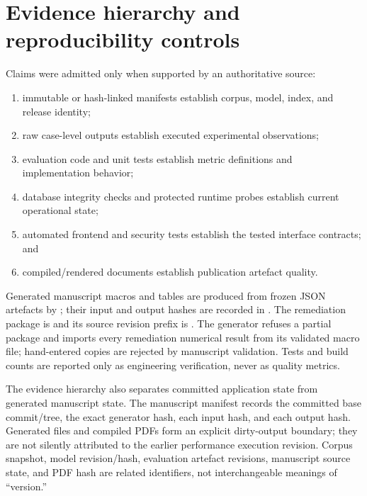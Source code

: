 \section{Evidence hierarchy and reproducibility controls}

Claims were admitted only when supported by an authoritative source:

\begin{enumerate}
  \item immutable or hash-linked manifests establish corpus, model, index, and release identity;
  \item raw case-level outputs establish executed experimental observations;
  \item evaluation code and unit tests establish metric definitions and implementation behavior;
  \item database integrity checks and protected runtime probes establish current operational state;
  \item automated frontend and security tests establish the tested interface contracts; and
  \item compiled/rendered documents establish publication artefact quality.
\end{enumerate}

Generated manuscript macros and tables are produced from frozen JSON artefacts by ; their input and output hashes are recorded in . The remediation package is \VTwoPackageStatus{} and its source revision prefix is \texttt{\VTwoEvaluationSourceCommitPrefix}. The generator refuses a partial package and imports every remediation numerical result from its validated macro file; hand-entered copies are rejected by manuscript validation. Tests and build counts are reported only as engineering verification, never as quality metrics.

The evidence hierarchy also separates committed application state from generated manuscript state. The manuscript manifest records the committed base commit/tree, the exact generator hash, each input hash, and each output hash. Generated files and compiled PDFs form an explicit dirty-output boundary; they are not silently attributed to the earlier performance execution revision. Corpus snapshot, model revision/hash, evaluation artefact revisions, manuscript source state, and PDF hash are related identifiers, not interchangeable meanings of ``version.''

